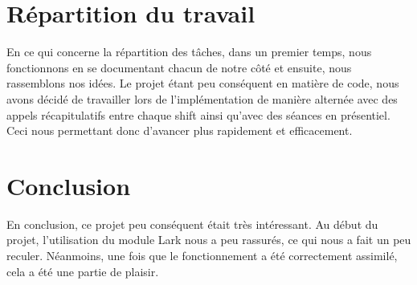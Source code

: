 \section{Répartition du travail}
En ce qui concerne la répartition des tâches, dans un premier temps, nous fonctionnons en se documentant chacun de notre côté et ensuite, nous rassemblons nos idées.
Le projet étant peu conséquent en matière de code, nous avons décidé de travailler lors de l'implémentation de manière alternée avec des appels récapitulatifs entre chaque shift ainsi qu'avec des séances en présentiel.
Ceci nous permettant donc d'avancer plus rapidement et efficacement.

\section{Conclusion}
En conclusion, ce projet peu conséquent était très intéressant.
Au début du projet, l'utilisation du module Lark nous a peu rassurés, ce qui nous a fait un peu reculer. 
Néanmoins, une fois que le fonctionnement a été correctement assimilé, cela a été une partie de plaisir.

